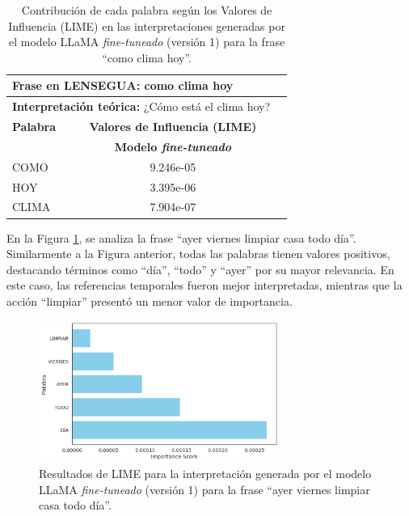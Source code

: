 \vspace{0.5cm}
\begin{table}[H]
\centering
    \begin{tabular}{|l|c|c|}
        \hline
        \multicolumn{2}{|l|}{\textbf{Frase en LENSEGUA:} como clima hoy} \\ \hline
        \multicolumn{2}{|l|}{\textbf{Interpretación teórica:} ¿Cómo está el clima hoy?} \\ \hline \hline
        
        \textbf{Palabra} & \multicolumn{1}{c|}{\textbf{Valores de Influencia (LIME)}} \\ 
        \cline{3-0} & \textbf{Modelo \textit{fine-tuneado}} \\
         
        \hline
        COMO  & 9.246e-05  \\ \hline
        HOY & 3.395e-06 \\ \hline
        CLIMA & 7.904e-07 \\ \hline
        
    \end{tabular}
\caption{Contribución de cada palabra según los Valores de Influencia (LIME) en las interpretaciones generadas por el modelo LLaMA \textit{fine-tuneado} (versión 1) para la frase “como clima hoy”.}
\label{tab:LIME1-LLAMA1}
\end{table}


En la Figura \ref{fig:LIME1-LLAMA2}, se analiza la frase “ayer viernes limpiar casa todo día”. Similarmente a la Figura anterior, todas las palabras tienen valores positivos, destacando términos como “día”, “todo” y “ayer” por su mayor relevancia. En este caso, las referencias temporales fueron mejor interpretadas, mientras que la acción “limpiar” presentó un menor valor de importancia.

\begin{figure}[H]
\centering
    \includegraphics[width=0.7\textwidth]{figuras/Oracion2.png}
    \caption{Resultados de LIME para la interpretación generada por el modelo LLaMA \textit{fine-tuneado} (versión 1) para la frase “ayer viernes limpiar casa todo día”.}
    \label{fig:LIME1-LLAMA2}
\end{figure}



